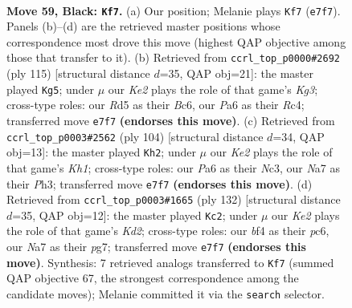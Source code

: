 \documentclass[11pt]{article}
\begin{document}
\clearpage

\begin{figure}[p]\centering
\begin{subfigure}{0.46\textwidth}\centering
\resizebox{\linewidth}{!}{%
\newchessgame
\chessboard[
  setfen={7K/n1P1k3/p7/P2r1p1p/4pB2/5bP1/8/RN6 b - - 25 59},
  showmover=false,
  pgfstyle=straightmove, color=movearrow, markmove={e7-f7}
]}
\caption{}
\end{subfigure}\hfill
\begin{subfigure}{0.46\textwidth}\centering
\resizebox{\linewidth}{!}{%
\newchessgame
\chessboard[
  setfen={8/1p6/p1b3k1/4B3/2r4p/P4P2/1P1R1K1P/8 b - - 26 58},
  showmover=false,
  pgfstyle=straightmove, color=movearrow, markmove={g6-g5}
]}
\caption{}
\end{subfigure}
\\[4pt]
\begin{subfigure}{0.46\textwidth}\centering
\resizebox{\linewidth}{!}{%
\newchessgame
\chessboard[
  setfen={1n6/1B3bk1/4r1p1/P6p/2p5/2N4P/6P1/5R1K w - - 4 53},
  showmover=false,
  pgfstyle=straightmove, color=movearrow, markmove={h1-h2}
]}
\caption{}
\end{subfigure}\hfill
\begin{subfigure}{0.46\textwidth}\centering
\resizebox{\linewidth}{!}{%
\newchessgame
\chessboard[
  setfen={1r2b3/6pk/2p1P3/R2p1pB1/p2P1P1P/P7/3K4/8 w - - 3 67},
  showmover=false,
  pgfstyle=straightmove, color=movearrow, markmove={d2-c2}
]}
\caption{}
\end{subfigure}
\caption{\textbf{Move 59, Black: \texttt{Kf7}.} (a) Our position; Melanie plays \texttt{Kf7} (\texttt{e7f7}). Panels (b)--(d) are the retrieved master positions whose correspondence most drove this move (highest QAP objective among those that transfer to it). (b) Retrieved from \texttt{ccrl\_top\_p0000\#2692} (ply 115) [structural distance $d$=35, QAP obj=21]: the master played \texttt{Kg5}; under $\mu$ our \emph{Ke2} plays the role of that game's \emph{Kg3}; cross-type roles: our \emph{R}d5 as their \emph{B}c6, our \emph{P}a6 as their \emph{R}c4; transferred move \texttt{e7f7} \textbf{(endorses this move)}. (c) Retrieved from \texttt{ccrl\_top\_p0003\#2562} (ply 104) [structural distance $d$=34, QAP obj=13]: the master played \texttt{Kh2}; under $\mu$ our \emph{Ke2} plays the role of that game's \emph{Kh1}; cross-type roles: our \emph{P}a6 as their \emph{N}c3, our \emph{N}a7 as their \emph{P}h3; transferred move \texttt{e7f7} \textbf{(endorses this move)}. (d) Retrieved from \texttt{ccrl\_top\_p0003\#1665} (ply 132) [structural distance $d$=35, QAP obj=12]: the master played \texttt{Kc2}; under $\mu$ our \emph{Ke2} plays the role of that game's \emph{Kd2}; cross-type roles: our \emph{b}f4 as their \emph{p}c6, our \emph{N}a7 as their \emph{p}g7; transferred move \texttt{e7f7} \textbf{(endorses this move)}. Synthesis: 7 retrieved analogs transferred to \texttt{Kf7} (summed QAP objective 67, the strongest correspondence among the candidate moves); Melanie committed it via the \texttt{search} selector.}
\label{fig:thought-m117}
\end{figure}
\end{document}

